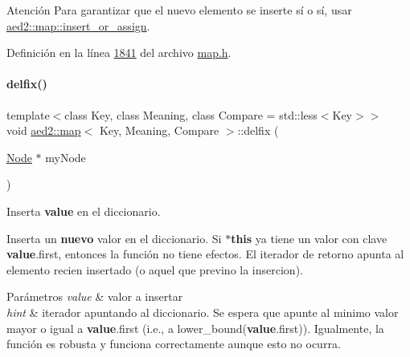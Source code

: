 \begin{DoxyAttention}{Atención}
Para garantizar que el nuevo elemento se inserte sí o sí, usar \hyperlink{classaed2_1_1map_a2ef6723c183916276b0afc4a4c721475_a2ef6723c183916276b0afc4a4c721475}{aed2\+::map\+::insert\+\_\+or\+\_\+assign}. 
\end{DoxyAttention}


Definición en la línea \hyperlink{map_8h_source_l01841}{1841} del archivo \hyperlink{map_8h_source}{map.\+h}.

\mbox{\label{classaed2_1_1map_a056322ff63d37b43d042ffa0378c9fd2_a056322ff63d37b43d042ffa0378c9fd2}} 
\paragraph{\texorpdfstring{delfix()}{delfix()}}
{\footnotesize\ttfamily template$<$class Key, class Meaning, class Compare = std\+::less$<$\+Key$>$$>$ \\
void \hyperlink{classaed2_1_1map}{aed2\+::map}$<$ Key, Meaning, Compare $>$\+::delfix (\begin{DoxyParamCaption}\item[{\hyperlink{structaed2_1_1map_1_1Node}{Node} $\ast$}]{my\+Node }\end{DoxyParamCaption})\hspace{0.3cm}{\ttfamily [inline]}}



Inserta {\bfseries value} en el diccionario. 

Inserta un {\bfseries nuevo} valor en el diccionario. Si {\bfseries $\ast$this} ya tiene un valor con clave {\bfseries value}.first, entonces la función no tiene efectos. El iterador de retorno apunta al elemento recien insertado (o aquel que previno la insercion).


\begin{DoxyParams}{Parámetros}
{\em value} & valor a insertar \\
\hline
{\em hint} & iterador apuntando al diccionario. Se espera que apunte al minimo valor mayor o igual a {\bfseries value}.first (i.\+e., a lower\+\_\+bound({\bfseries value}.first)). Igualmente, la función es robusta y funciona correctamente aunque esto no ocurra. \\
\hline
\end{DoxyParams}


